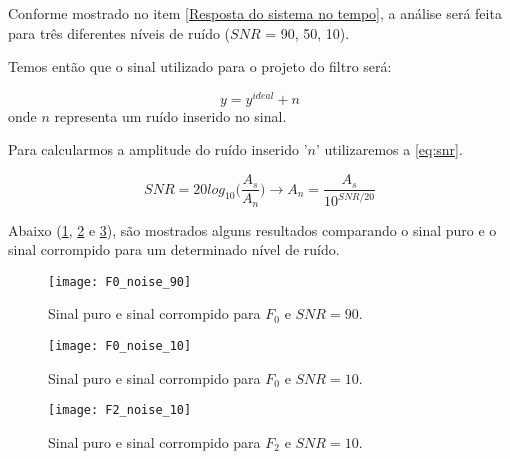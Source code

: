 Conforme mostrado no item \ref{Resposta do sistema no tempo}, a análise será feita para três diferentes níveis de ruído ($ SNR $ = 90, 50, 10). 

Temos então que o sinal utilizado para o projeto do filtro será:

\begin{equation}
y = y^{ideal} + n
\end{equation}
onde $ n $ representa um ruído inserido no sinal.

Para calcularmos a amplitude do ruído inserido '$ n $' utilizaremos a \cref{eq:snr}.

\begin{equation} \label{eq:snr}
SNR = 20log_{10}\Bigg(\frac{A_s}{A_n}\Bigg) \rightarrow A_n = \frac{A_s}{10^{SNR/20}}
\end{equation}

Abaixo (\cref{fig:F0_noise_90}, \cref{fig:F0_noise_10} e \cref{fig:F2_noise_10}), são mostrados alguns resultados comparando o sinal puro e o sinal corrompido para um determinado nível de ruído.

\begin{figure}
	\centering
	\texttt{[image: F0\_noise\_90]}
	\caption{Sinal puro e sinal corrompido para $ F_0 $ e $ SNR=90 $.}
	\label{fig:F0_noise_90}
\end{figure}

\begin{figure}
	\centering
	\texttt{[image: F0\_noise\_10]}
	\caption{Sinal puro e sinal corrompido para $ F_0 $ e $ SNR=10 $.}
	\label{fig:F0_noise_10}
\end{figure}

\begin{figure}
	\centering
	\texttt{[image: F2\_noise\_10]}
	\caption{Sinal puro e sinal corrompido para $ F_2 $ e $ SNR=10 $.}
	\label{fig:F2_noise_10}
\end{figure}

